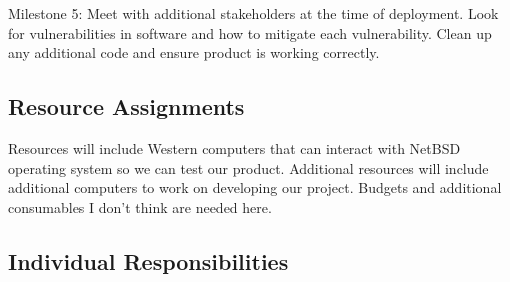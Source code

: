 Milestone 5: Meet with additional stakeholders at the time of deployment. Look for vulnerabilities in software and how to mitigate each vulnerability. Clean up any 
additional code and ensure product is working correctly. 


\subsection{Resource Assignments}
%

Resources will include Western computers that can interact with NetBSD operating system so we can test our product. Additional resources will include 
additional computers to work on developing our project. Budgets and additional consumables I don’t think are needed here. 


\subsection{Individual Responsibilities}
%



